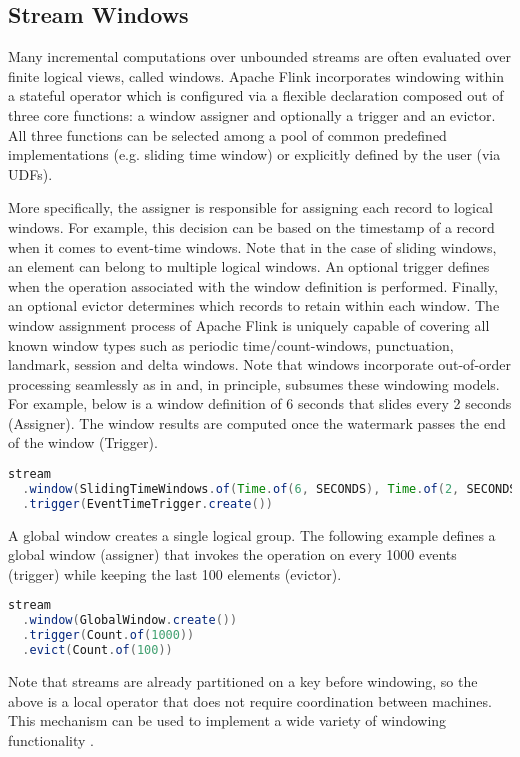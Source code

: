 \subsection{Stream Windows}
Many incremental computations over unbounded streams are often evaluated over finite logical views, called windows. Apache Flink incorporates windowing within a stateful operator which is configured via a flexible declaration composed out of three core functions: a window assigner and optionally a trigger and an evictor. All three functions can be selected among a pool of common predefined implementations (e.g. sliding time window) or explicitly defined by the user (via UDFs).

More specifically, the assigner is responsible for assigning each record to logical windows. For example, this decision can be based on the timestamp of a record when it comes to event-time windows. Note that in the case of sliding windows, an element can belong to multiple logical windows. An optional trigger defines when the operation associated with the window definition is performed. Finally, an optional evictor determines which records to retain within each window. The window assignment process of Apache Flink is uniquely capable of covering all known window types such as periodic time/count-windows, punctuation, landmark, session and delta windows. Note that windows incorporate out-of-order processing seamlessly as in \cite{li2005semantics, akidau2015dataflow} and, in principle, subsumes these windowing models. For example, below is a window definition of 6 seconds that slides every 2 seconds (Assigner). The window results are computed once the watermark passes the end of the window (Trigger).

\begin{lstlisting}[language=Java]
stream
  .window(SlidingTimeWindows.of(Time.of(6, SECONDS), Time.of(2, SECONDS))
  .trigger(EventTimeTrigger.create())
\end{lstlisting}

A global window creates a single logical group. The following example defines a global window (assigner) that invokes the operation on every 1000 events (trigger) while keeping the last 100 elements (evictor). 

\begin{lstlisting}[language=Java]
stream
  .window(GlobalWindow.create())
  .trigger(Count.of(1000))
  .evict(Count.of(100))
\end{lstlisting}

Note that streams are already partitioned on a key before windowing, so the above is a local operator that does not require coordination between machines. This mechanism can be used to implement a wide variety of windowing functionality \cite{akidau2015dataflow}. 





